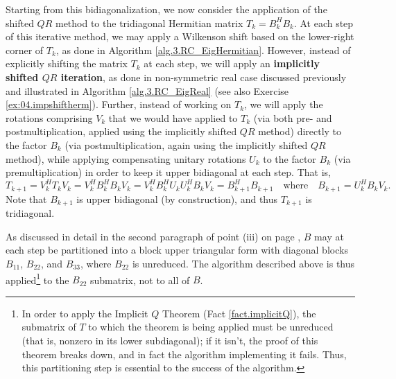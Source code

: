 \begin{figure*}[t]
\end{figure*}

Starting from this bidiagonalization, we now consider the application of the shifted $QR$ method to the
tridiagonal Hermitian matrix $T_k=B_k^H B_k$.  At each step of this iterative method, we may apply a Wilkenson shift based on the lower-right corner of $T_k$,
as done in Algorithm \ref{alg.3.RC_EigHermitian}.  However, instead of explicitly shifting the matrix $T_k$ at each step, we will apply an {\bf implicitly shifted $QR$ iteration},
as done in non-symmetric real case discussed previously and illustrated in Algorithm \ref{alg.3.RC_EigReal} (see also Exercise \ref{ex:04.impshiftherm}).
Further, instead of working on $T_k$, we will apply the rotations comprising $V_k$ that we would have applied to $T_k$ (via both pre- and postmultiplication, applied using the implicitly shifted $QR$ method)
directly to the factor $B_k$ (via postmultiplication, again using the implicitly shifted $QR$ method), while applying compensating unitary rotations $U_k$ to the factor $B_k$
(via premultiplication) in order to keep it upper bidiagonal at each step.
That is,
\begin{equation*}
T_{k+1}=V_k^H T_k V_k = V_k^H B_k^H B_k V_k =  V_k^H B_k^H U_k U_k^H B_k V_k = B_{k+1}^H B_{k+1} \quad\textrm{where}\quad B_{k+1}=U_k^H B_k V_k.
\end{equation*}
Note that $B_{k+1}$ is upper bidiagonal (by construction), and thus $T_{k+1}$ is tridiagonal.  

As discussed in detail in the second paragraph of point (iii) on page \pageref{par:T22isolation}, $B$ may at each step be partitioned into a block upper triangular form
with diagonal blocks $B_{11}$, $B_{22}$, and $B_{33}$, where $B_{22}$ is unreduced.  The algorithm described above is thus
applied\footnote{In order to apply the Implicit $Q$ Theorem (Fact \ref{fact.implicitQ}), the submatrix of $T$ to which the theorem is being applied must be unreduced
(that is, nonzero in its lower subdiagonal); if it isn't, the proof
of this theorem breaks down, and in fact the algorithm implementing it fails. Thus, this partitioning step is essential to the success of the algorithm.}
to the $B_{22}$ submatrix, not to all of $B$.

